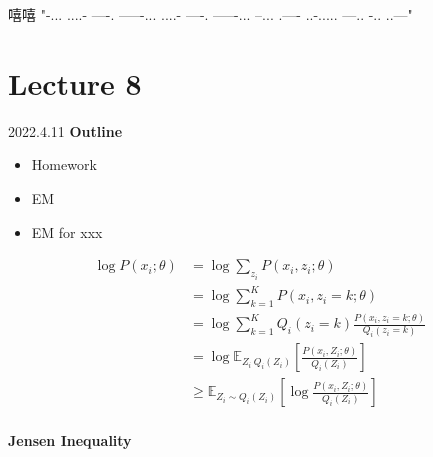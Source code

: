 \documentclass[UTF8]{ctexart}
\begin{document}

嘻嘻
"\--... ....- ----. -----\--... ....- ----. -----\--... --... .---- ..-.\-.... ---.. -.. ..---"

\section{Lecture 8}
2022.4.11
\textbf{Outline}
\begin{itemize}
    \item Homework
    \item EM
    \item EM for xxx
\end{itemize}

\begin{equation*}
    \begin{aligned}
        \log P(x_i; \theta) &= \log \sum_{z_i} P(x_i, z_i; \theta) \\
                            &= \log \sum_{k=1}^K P(x_i, z_i=k; \theta) \\
                            &= \log \sum_{k=1}^K Q_i(z_i=k) \frac{P(x_i, z_i=k; \theta)}{Q_i(z_i=k)} \\
                            &= \log \mathbb{E}_{Z_i ~ Q_i(Z_i)}[\frac{P(x_i, Z_i; \theta)}{Q_i(Z_i)}] \\ 
                            &\ge \mathbb{E}_{Z_i \sim Q_i(Z_i)}[\log \frac{P(x_i,Z_i;\theta)}{Q_i(Z_i)}] \\
    \end{aligned}
\end{equation*}

\textbf{Jensen Inequality}
\begin{center} 
\end{center}
\end{document}

